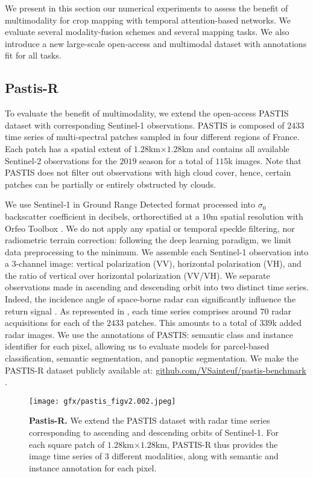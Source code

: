 We present in this section our numerical experiments to assess the benefit of multimodality for crop mapping with temporal attention-based networks. We evaluate several modality-fusion schemes and several mapping tasks. We also introduce a new large-scale open-access  and multimodal  dataset with annotations fit for all tasks.
\subsection{Pastis-R}
To evaluate the benefit of multimodality, we extend the open-access PASTIS dataset \citep{pastis} with corresponding Sentinel-1 observations.
PASTIS is composed of $2433$ time series of  multi-spectral patches sampled in four different regions of France. Each patch has a spatial extent of $1.28$km$\times1.28$km and contains all available Sentinel-2 observations for the $2019$ season for a total of $115$k images.
Note that PASTIS does not filter out  observations with high cloud cover, hence, certain patches can be partially or entirely obstructed by clouds.


We use Sentinel-1 in Ground Range Detected format processed into { $\sigma_0$ backscatter coefficient } in decibels, {orthorectified at a } $10$m spatial resolution with Orfeo Toolbox \citep{christophe2008orfeo}. We do not apply any spatial or temporal speckle filtering, {nor radiometric terrain correction}: {following the deep learning paradigm, we limit data preprocessing to the minimum.} We assemble each Sentinel-1 observation into a $3$-channel image: vertical polarization (VV), horizontal polarisation (VH), and the ratio of vertical over horizontal polarization (VV/VH). We separate observations made in ascending and descending orbit into two distinct time series. Indeed, the incidence angle of space-borne radar can significantly influence the return signal \citep{singhroy1999effects}. As represented in , each time series comprises around $70$ radar acquisitions { for each of the $2433$ patches. This amounts to } a total of $339$k added radar images.
We use the annotations of PASTIS: semantic class and instance identifier for each pixel, allowing us to evaluate models for parcel-based classification, semantic segmentation, and panoptic segmentation. We make the PASTIS-R dataset \citep{pastis-r} publicly available at: \url{github.com/VSainteuf/pastis-benchmark} . 

\begin{figure}
    \centering
    \texttt{[image: gfx/pastis\_figv2.002.jpeg]}
    \caption{\textbf{{Pastis-R.}} We extend the PASTIS dataset with radar time series corresponding to ascending and descending orbits of Sentinel-1. For each square patch of $1.28$km$\times1.28$km, PASTIS-R thus provides the image time series of $3$ different modalities, along with semantic and instance annotation for each pixel.}
    \label{fig:pastis}
\end{figure}

